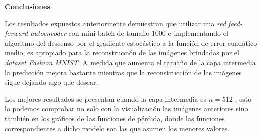 \documentclass[12pt,a4paper]{article}
\begin{document}
\begin{multicols}{2}
\begin{center}
\begin{large}
\textbf{Conclusiones}
\end{large}
\end{center}

Los resultados expuestos anteriormente demuestran que utilizar una \textit{red feed-forward autoencoder} con mini-batch de tamaño $1000$ e implementando el algoritmo del descenso por el gradiente estocástico a la función de error cuadático medio, es apropiado para la reconstrucción de las imágenes brindadas por el \textit{dataset Fashion MNIST}. A medida que aumenta el tamaño de la capa intermedia la predicción mejora bastante mientras que la reconstrucción de las imágenes sigue dejando algo que desear.  

Los mejores resultados se presentan cuando la capa intermedia es $n=512$ , esto lo podemos comprobar no solo con la visualización las imágenes anteriores sino también en los gráficos de las funciones de pérdida, donde las funciones correspondientes a dicho modelo son las que asumen los menores valores.

\end{multicols}
\end{document}
